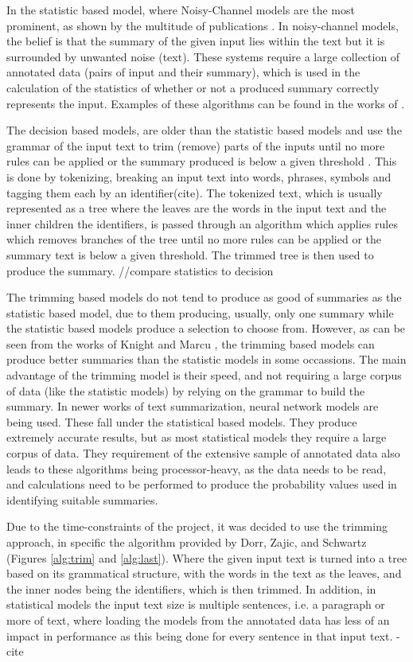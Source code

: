 \par In the statistic based model, where Noisy-Channel models are the most prominent, as shown by the multitude of publications \cite{daumemarcu2002,rushchopraweston2015,chopraaulirush2016}. In noisy-channel models, the belief is that the summary of the given input lies within the text but it is surrounded by unwanted noise (text). These systems require a large collection of annotated data (pairs of input and their summary), which is used in the calculation of the statistics of whether or not a produced summary correctly represents the input. Examples of these algorithms can be found in the works of \cite{daumemarcu2002,knightmarcu2000}.
\par The decision based models, are older than the statistic based models and use the grammar of the input text to trim (remove) parts of the inputs until no more rules can be applied or the summary produced is below a given threshold \cite{dorrzajicschwartz2003}. This is done by tokenizing, breaking an input text into words, phrases, symbols and tagging them each by an identifier(cite). The tokenized text, which is usually represented as a tree where the leaves are the words in the input text and the inner children the identifiers, is passed through an algorithm which applies rules which removes branches of the tree until no more rules can be applied or the summary text is below a given threshold. The trimmed tree is then used to produce the summary.
//compare statistics to decision
\par The trimming based models do not tend to produce as good of summaries as the statistic based model, due to them producing, usually, only one summary while the statistic based models produce a selection to choose from. However, as can be seen from the works of Knight and Marcu \cite{knightmarcu2000}, the trimming based models can produce better summaries than the statistic models in some occassions. The main advantage of the trimming model is their speed, and not requiring a large corpus of data (like the statistic models) by relying on the grammar to build the summary. In newer works of text summarization, neural network models are being used. These fall under the statistical based models. They produce extremely accurate results, but as most statistical models they require a large corpus of data. They requirement of the extensive sample of annotated data also leads to these algorithms being processor-heavy, as the data needs to be read, and calculations need to be performed to produce the probability values used in identifying suitable summaries.
\par Due to the time-constraints of the project, it was decided to use the trimming approach, in specific the algorithm provided by Dorr, Zajic, and Schwartz \cite{dorrzajicschwartz2003} (Figures \ref{alg:trim} and \ref{alg:last}). Where the given input text is turned into a tree based on its grammatical structure, with the words in the text as the leaves, and the inner nodes being the identifiers, which is then trimmed. In addition, in statistical models the input text size is multiple sentences, i.e. a paragraph or more of text, where loading the models from the annotated data has less of an impact in performance as this being done for every sentence in that input text. 
-cite


